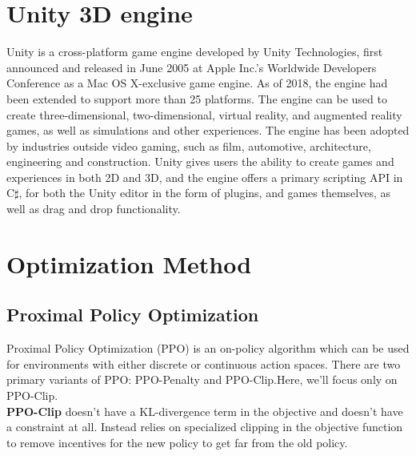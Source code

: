 \documentclass[12pt,a4paper,oneside]{book}
\theoremstyle{plain}
\numberwithin{equation}{chapter} \DeclareMathOperator{\Var}{Var}
\begin{document}
\section{Unity 3D engine }\label{Sec2.3}
Unity is a cross-platform game engine developed by Unity Technologies, first announced and released in June 2005 at Apple Inc.'s Worldwide Developers Conference as a Mac OS X-exclusive game engine. As of 2018, the engine had been extended to support more than 25 platforms. The engine can be used to create three-dimensional, two-dimensional, virtual reality, and augmented reality games, as well as simulations and other experiences. The engine has been adopted by industries outside video gaming, such as film, automotive, architecture, engineering and construction. Unity gives users the ability to create games and experiences in both 2D and 3D, and the engine offers a primary scripting API in C$\sharp$, for both the Unity editor in the form of plugins, and games themselves, as well as drag and drop functionality.


\section{Optimization Method }\label{Sec2.4}
\subsection{Proximal Policy Optimization}\label{Sec2.4.1}
Proximal Policy Optimization (PPO) is an on-policy algorithm which can be used for environments with either discrete or continuous action spaces. There are two primary variants of PPO: PPO-Penalty and PPO-Clip.Here, we’ll focus only on PPO-Clip.\\
\textbf{PPO-Clip} doesn’t have a KL-divergence term in the objective and doesn’t have a constraint at all. Instead relies on specialized clipping in the objective function to remove incentives for the new policy to get far from the old policy.\\
\end{document}
